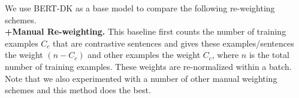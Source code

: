 We use BERT-DK as a base model to compare the following re-weighting schemes.\\
\textbf{+Manual Re-weighting.}
This baseline first counts the number of training examples $C_c$ that are contrastive sentences and gives these examples/sentences the weight $(n-{C_c})$ and other examples the weight $C_c$, where $n$ is the total number of training examples. 
These weights are re-normalized within a batch. 
Note that we also experimented with a number of other manual weighting schemes and this method does the best. \\
